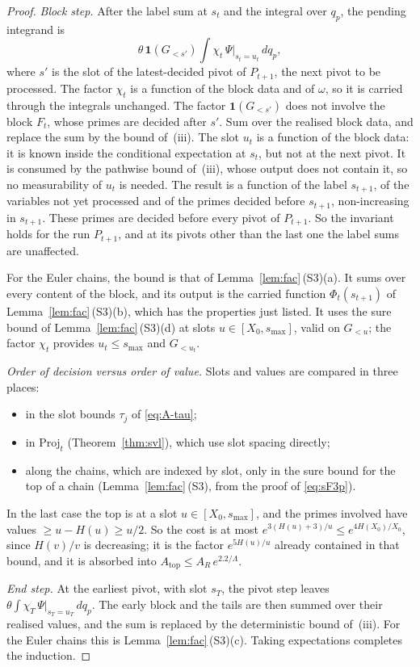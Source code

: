 \begin{proof}
\emph{Block step.} After the label sum at $s_t$ and the integral over $q_p$, the pending integrand is
\[
  \theta\,\mathbf 1(G_{<s'})\int\chi_t\,\Psi|_{s_t=u_t}\,dq_p ,
\]
where $s'$ is the slot of the latest-decided pivot of $P_{t+1}$, the next pivot to be processed. The factor $\chi_t$ is a function of the block data and of
$\omega$, so it is carried through the integrals unchanged. The factor $\mathbf 1(G_{<s'})$ does not involve the block
$F_t$, whose primes are decided after $s'$. Sum over the realised block data, and replace the sum by the bound
of~(iii). The slot $u_t$ is a function of the block data: it is known inside the conditional expectation at $s_t$, but
not at the next pivot. It is consumed by the pathwise bound of~(iii), whose output does not contain it, so no
measurability of $u_t$ is needed. The result is a function of the label $s_{t+1}$, of the variables not yet processed
and of the primes decided before $s_{t+1}$, non-increasing in $s_{t+1}$. These primes are decided before every pivot of
$P_{t+1}$. So the invariant holds for the run $P_{t+1}$, and at its pivots other than the
last one the label sums are unaffected.

For the Euler chains, the bound is that of Lemma~\ref{lem:fac}\,(S3)(a). It sums over every content of the block,
and its output is the carried function $\Phi_t(s_{t+1})$ of Lemma~\ref{lem:fac}\,(S3)(b), which has the properties just
listed. It uses the sure bound of Lemma~\ref{lem:fac}\,(S3)(d) at slots $u\in[X_0,s_{\max}]$, valid on $G_{<u}$; the
factor $\chi_t$ provides $u_t\le s_{\max}$ and $G_{<u_t}$.

\emph{Order of decision versus order of value.} Slots and values are compared in three places:
\begin{itemize}
\item in the slot bounds $\tau_j$ of \eqref{eq:A-tau};
\item in $\mathrm{Proj}_t$ (Theorem~\ref{thm:svl}), which use slot spacing directly;
\item along the chains, which are indexed by slot, only in the sure bound for the top of a chain (Lemma~\ref{lem:fac}\,(S3),
  from the proof of \ref{eq:sF3p}).
\end{itemize}
In the last case the top is at a slot $u\in[X_0,s_{\max}]$, and the primes involved have values $\ge u-H(u)\ge u/2$.
So the cost is at most $e^{3(H(u)+3)/u}\le e^{4H(X_0)/X_0}$, since $H(v)/v$ is decreasing; it is the factor
$e^{5H(u)/u}$ already contained in that bound, and it is absorbed into $A_{\mathrm{top}}\le A_R\,e^{2.2/\Lambda}$.

\emph{End step.} At the earliest pivot, with slot $s_T$, the pivot step leaves
$\theta\int\chi_T\,\Psi|_{s_T=u_T}\,dq_p$. The early block and the tails are then summed over their realised values, and
the sum is replaced by the deterministic bound of~(iii). For the Euler chains this is Lemma~\ref{lem:fac}\,(S3)(c).
Taking expectations completes the induction.
\end{proof}


